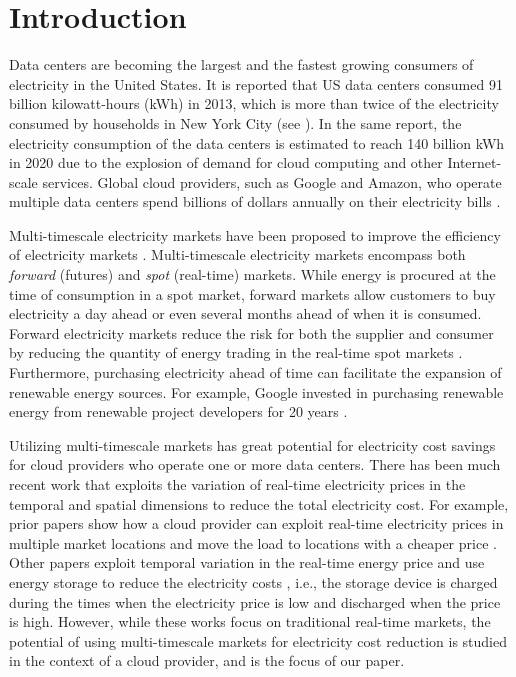 \section{Introduction}

Data centers are becoming the largest and the fastest growing consumers of electricity in the United States. It is reported that US data centers consumed 91 billion kilowatt-hours (kWh) in 2013, which is more than twice of the electricity consumed by households in New York City (see \cite{whitney2014data}). In the same report, the electricity consumption of the data centers is estimated to reach 140 billion kWh in 2020 due to the explosion of demand for cloud computing and other Internet-scale services. Global cloud providers, such as Google and Amazon, who operate multiple data centers spend billions of dollars annually on their electricity bills \cite{qureshi2009cutting}.


Multi-timescale electricity markets have been proposed to improve the efficiency of electricity markets \cite{cramton2007colombia}. Multi-timescale electricity markets encompass both {\em forward}  (futures) and {\em spot} (real-time) markets. While energy is procured at the time of consumption in a spot market, forward markets allow customers to buy electricity a day ahead or even several months ahead of when it is consumed. Forward electricity markets reduce the risk for both the supplier and consumer by reducing the quantity of energy trading in the real-time spot markets \cite{ausubel2010using}. Furthermore, purchasing electricity ahead of time can facilitate the expansion of renewable energy sources. For example, Google invested in purchasing renewable energy from renewable project developers for 20 years \cite{google2015datacenter}.


Utilizing multi-timescale markets has great potential for electricity cost savings for cloud providers who operate one or more data centers. There has been much recent work that exploits the variation of real-time electricity prices in the temporal and spatial dimensions to reduce the total electricity cost. For example, prior papers show how a cloud provider can exploit real-time electricity prices in multiple market locations and move the load to locations with a cheaper price \cite{qureshi2009cutting, chiaraviglio2011energy, rao2010minimizing}. Other papers exploit temporal variation in the real-time energy price and use energy storage to reduce the electricity costs \cite{guo2011cutting, guo2013electricity,zheng2014exploiting}, i.e., the storage device is charged during the times when the electricity price is low and discharged when the price is high. However, while these works focus on traditional real-time markets, the potential of using multi-timescale markets for electricity cost reduction is studied in the context of a cloud provider, and is the focus of our paper.

